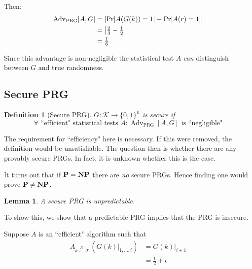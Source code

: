 \documentclass[10pt,a4paper]{report}
\newtheorem{definition}{Definition}[section]
\newtheorem{lemma}{Lemma}[section]
\begin{document}
Then:
\begin{equation*}
\begin{aligned}
    \operatorname{Adv}_\text{PRG}[A, G]
        &= \abs{\operatorname{Pr}[A(G(k)) = 1] - \operatorname{Pr}[A(r) = 1]} \\
        &= \abs{\tfrac{2}{3} - \tfrac{1}{2}} \\
        &= \tfrac{1}{6}
\end{aligned}
\end{equation*}

Since this advantage is non-negligible the statistical test $A$ \textit{can} distinguish between
$G$ and true randomness.

\subsection{Secure PRG}

\begin{definition}[Secure PRG]
    $G\colon \mathcal{K} \to \{0, 1\}^n$ is secure if
        $$ \forall \text{ ``efficient" statistical tests } A \colon
           \operatorname{Adv}_\text{PRG}[A, G] \text{ is ``negligible"} $$
\end{definition}

The requirement for ``efficiency" here is necessary. If this were removed, the definition would be
unsatisfiable. The question then is whether there are any provably secure PRGs. In fact, it is
unknown whether this is the case.

It turns out that if $\text{\textbf{P}} = \text{\textbf{NP}}$ there are \textit{no} secure PRGs.
Hence finding one would prove $\text{\textbf{P}} \ne \text{\textbf{NP}}$.

\begin{lemma}
    A secure PRG is unpredictable.
    \label{lemma:secure_prg_unpredictable}
\end{lemma}

To show this, we show that a predictable PRG implies that the PRG is insecure.

Suppose $A$ is an ``efficient" algorithm such that
\begin{equation*}
\begin{aligned}
    A_{k \xleftarrow{R} \mathcal{K}}(G(k) |_{1, \ldots, i}) &= G(k)|_{i+1}\\
                                                           &= \tfrac{1}{2} + \epsilon
\end{aligned}
\end{equation*}
\end{document}
